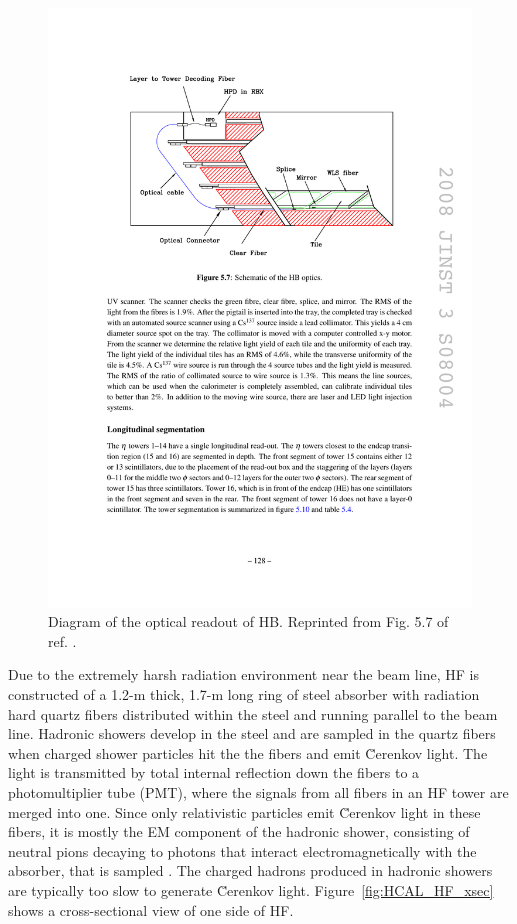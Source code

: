 \documentclass[dissertation.tex]{subfiles}
\begin{document}
\begin{figure}
	\centering
	\includegraphics[scale=1.0]{HCAL_HB_optics}
	\caption{Diagram of the optical readout of HB.  Reprinted from Fig. 5.7 of ref. \cite{1748-0221-3-08-S08004}.}
	\label{fig:HCAL_HB_optics}
\end{figure}

Due to the extremely harsh radiation environment near the beam line, HF is constructed of a 1.2-m thick, 1.7-m long ring of steel absorber with radiation hard quartz fibers distributed within the steel and running parallel to the beam line.  Hadronic showers develop in the steel and are sampled in the quartz fibers when charged shower particles hit the the fibers and emit \u{C}erenkov light.  The light is transmitted by total internal reflection down the fibers to a photomultiplier tube (PMT), where the signals from all fibers in an HF tower are merged into one.  Since only relativistic particles emit \u{C}erenkov light in these fibers, it is mostly the EM component of the hadronic shower, consisting of neutral pions decaying to photons that interact electromagnetically with the absorber, that is sampled \cite{Akchurin_Wigmans}.  The charged hadrons produced in hadronic showers are typically too slow to generate \u{C}erenkov light.  Figure~\ref{fig:HCAL_HF_xsec} shows a cross-sectional view of one side of HF.
\end{document}

